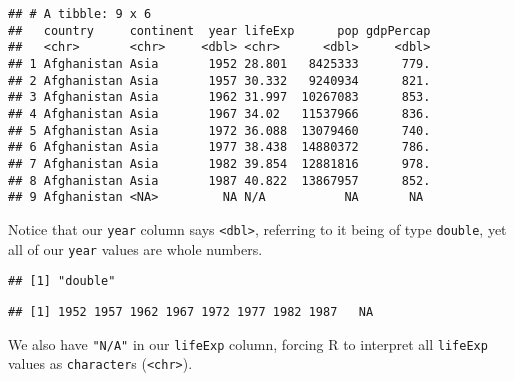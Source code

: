 \documentclass[
]{book}
\newenvironment{Shaded}{\begin{snugshade}}{\end{snugshade}}
\newcommand{\KeywordTok}[1]{\textcolor[rgb]{0.13,0.29,0.53}{\textbf{#1}}}
\newcommand{\NormalTok}[1]{#1}
\newcommand{\OperatorTok}[1]{\textcolor[rgb]{0.81,0.36,0.00}{\textbf{#1}}}
\begin{document}
\begin{verbatim}
## # A tibble: 9 x 6
##   country     continent  year lifeExp      pop gdpPercap
##   <chr>       <chr>     <dbl> <chr>      <dbl>     <dbl>
## 1 Afghanistan Asia       1952 28.801   8425333      779.
## 2 Afghanistan Asia       1957 30.332   9240934      821.
## 3 Afghanistan Asia       1962 31.997  10267083      853.
## 4 Afghanistan Asia       1967 34.02   11537966      836.
## 5 Afghanistan Asia       1972 36.088  13079460      740.
## 6 Afghanistan Asia       1977 38.438  14880372      786.
## 7 Afghanistan Asia       1982 39.854  12881816      978.
## 8 Afghanistan Asia       1987 40.822  13867957      852.
## 9 Afghanistan <NA>         NA N/A           NA       NA
\end{verbatim}

Notice that our \texttt{year} column says \texttt{\textless{}dbl\textgreater{}}, referring to it being of type \texttt{double}, yet all of our \texttt{year} values are whole numbers.

\begin{Shaded}
\end{Shaded}

\begin{verbatim}
## [1] "double"
\end{verbatim}

\begin{Shaded}
\end{Shaded}

\begin{verbatim}
## [1] 1952 1957 1962 1967 1972 1977 1982 1987   NA
\end{verbatim}

We also have \texttt{"N/A"} in our \texttt{lifeExp} column, forcing R to interpret all \texttt{lifeExp} values as \texttt{character}s (\texttt{\textless{}chr\textgreater{}}).

\begin{Shaded}
\end{Shaded}
\end{document}
